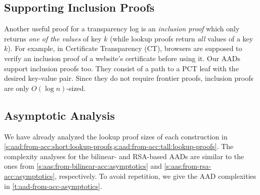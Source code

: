 \subsection{Supporting Inclusion Proofs}
Another useful proof for a transparency log is an \textit{inclusion proof} which only returns \textit{one of the values} of key $k$ (while lookup proofs return \textit{all} values of a key $k$).
For example, in Certificate Transparency (CT), browsers are supposed to verify an inclusion proof of a website's certificate before using it.
Our AADs support inclusion proofs too.
They consist of a path to a PCT leaf with the desired key-value pair.
Since they do not require frontier proofs, inclusion proofs are only $O(\log{n})$-sized.

\subsection{Asymptotic Analysis}
\label{s:aad:from-acc:asymptotics}
We have already analyzed the lookup proof sizes of each construction in \cref{s:aad:from-acc:short:lookup-proofs,s:aad:from-acc:tall:lookup-proofs}.
The complexity analyses for the bilinear- and RSA-based AADs are similar to the ones from \cref{s:aas:from-bilinear-acc:asymptotics} and \cref{s:aas:from-rsa-acc:asymptotics}, respectively.
To avoid repetition, we give the AAD complexities in \cref{t:aad-from-acc-asymptotics}.